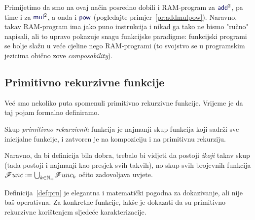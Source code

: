 Primijetimo da smo na ovaj način posredno dobili i RAM-program za $\f{add}^2$, pa time i za $\f{mul}^2$, a onda i $\f{pow}$ (pogledajte primjer~\ref{pr:addmulpow}). Naravno, takav RAM-program ima jako puno instrukcija i nikad ga tako ne bismo "ručno" napisali, ali to upravo pokazuje snagu funkcijske paradigme: funkcijski programi se bolje slažu u veće cjeline nego RAM-programi (to svojstvo se u programskim jezicima obično zove \emph{composability}). 
\subsection{Primitivno rekurzivne funkcije}

Već smo nekoliko puta spomenuli primitivno rekurzivne funkcije. Vrijeme je da taj pojam formalno definiramo.

\begin{definicija}[{name=[primitivno rekurzivne funkcije]}]\label{def:prn}
Skup \emph{primitivno rekurzivnih} funkcija je najmanji skup funkcija koji sadrži sve inicijalne funkcije, i zatvoren je na kompoziciju i na primitivnu rekurziju.
\end{definicija}

Naravno, da bi definicija bila dobra, trebalo bi vidjeti da postoji \emph{ikoji} takav skup (tada postoji i najmanji kao presjek svih takvih), no skup svih brojevnih funkcija $\mathscr Func:=\bigcup_{k\in{\mathbb N}_+}\!\mathscr Func_k$ očito zadovoljava uvjete.

Definicija~\ref{def:prn} je elegantna i matematički pogodna za dokazivanje, ali nije baš operativna. Za konkretne funkcije, lakše je dokazati da su primitivno rekurzivne korištenjem sljedeće karakterizacije.

